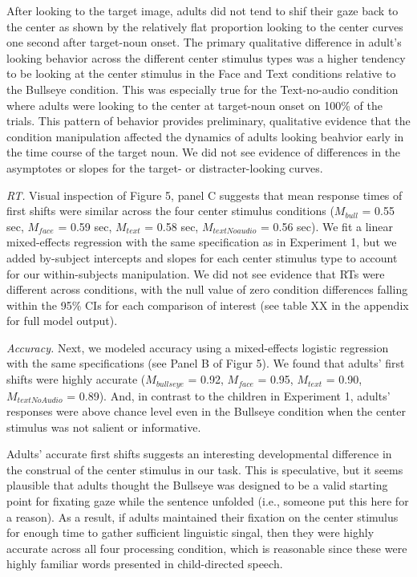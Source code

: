 \documentclass[english,floatsintext,man]{apa6}
\begin{document}
After looking to the target image, adults did not tend to shif their
gaze back to the center as shown by the relatively flat proportion
looking to the center curves one second after target-noun onset. The
primary qualitative difference in adult's looking behavior across the
different center stimulus types was a higher tendency to be looking at
the center stimulus in the Face and Text conditions relative to the
Bullseye condition. This was especially true for the Text-no-audio
condition where adults were looking to the center at target-noun onset
on 100\% of the trials. This pattern of behavior provides preliminary,
qualitative evidence that the condition manipulation affected the
dynamics of adults looking beahvior early in the time course of the
target noun. We did not see evidence of differences in the asymptotes or
slopes for the target- or distracter-looking curves.

\emph{RT.} Visual inspection of Figure 5, panel C suggests that mean
response times of first shifts were similar across the four center
stimulus conditions (\(M_{bull}\) = 0.55 sec, \(M_{face}\) = 0.59 sec,
\(M_{text}\) = 0.58 sec, \(M_{textNoaudio}\) = 0.56 sec). We fit a
linear mixed-effects regression with the same specification as in
Experiment 1, but we added by-subject intercepts and slopes for each
center stimulus type to account for our within-subjects manipulation. We
did not see evidence that RTs were different across conditions, with the
null value of zero condition differences falling within the 95\% CIs for
each comparison of interest (see table XX in the appendix for full model
output).

\emph{Accuracy.} Next, we modeled accuracy using a mixed-effects
logistic regression with the same specifications (see Panel B of Figur
5). We found that adults' first shifts were highly accurate
(\(M_{bullseye}\) = 0.92, \(M_{face}\) = 0.95, \(M_{text}\) = 0.90,
\(M_{textNoAudio}\) = 0.89). And, in contrast to the children in
Experiment 1, adults' responses were above chance level even in the
Bullseye condition when the center stimulus was not salient or
informative.

Adults' accurate first shifts suggests an interesting developmental
difference in the construal of the center stimulus in our task. This is
speculative, but it seems plausible that adults thought the Bullseye was
designed to be a valid starting point for fixating gaze while the
sentence unfolded (i.e., someone put this here for a reason). As a
result, if adults maintained their fixation on the center stimulus for
enough time to gather sufficient linguistic singal, then they were
highly accurate across all four processing condition, which is
reasonable since these were highly familiar words presented in
child-directed speech.
\end{document}
